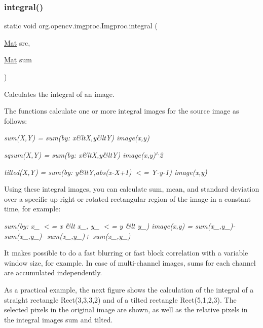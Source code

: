 \subsubsection{\texorpdfstring{integral()}{integral()}\hspace{0.1cm}{\footnotesize\ttfamily [2/2]}}
{\footnotesize\ttfamily static void org.\+opencv.\+imgproc.\+Imgproc.\+integral (\begin{DoxyParamCaption}\item[{\mbox{\hyperlink{classorg_1_1opencv_1_1core_1_1_mat}{Mat}}}]{src,  }\item[{\mbox{\hyperlink{classorg_1_1opencv_1_1core_1_1_mat}{Mat}}}]{sum }\end{DoxyParamCaption})\hspace{0.3cm}{\ttfamily [static]}}

Calculates the integral of an image.

The functions calculate one or more integral images for the source image as follows\+:

{\itshape sum(\+X,\+Y) = sum(by\+: x\&lt\+X,y\&lt\+Y) image(x,y)}

{\itshape sqsum(\+X,\+Y) = sum(by\+: x\&lt\+X,y\&lt\+Y) image(x,y)$^\wedge$2}

{\itshape tilted(\+X,\+Y) = sum(by\+: y\&ltY,abs(x-\/\+X+1) $<$= Y-\/y-\/1) image(x,y)}

Using these integral images, you can calculate sum, mean, and standard deviation over a specific up-\/right or rotated rectangular region of the image in a constant time, for example\+:

{\itshape sum(by\+: x\+\_ $<$= x \&lt x\+\_, y\+\_ $<$= y \&lt y\+\_) image(x,y) = sum(x\+\_,y\+\_)-\/ sum(x\+\_,y\+\_)-\/ sum(x\+\_,y\+\_)+ sum(x\+\_,y\+\_)}

It makes possible to do a fast blurring or fast block correlation with a variable window size, for example. In case of multi-\/channel images, sums for each channel are accumulated independently.

As a practical example, the next figure shows the calculation of the integral of a straight rectangle {\ttfamily Rect(3,3,3,2)} and of a tilted rectangle {\ttfamily Rect(5,1,2,3)}. The selected pixels in the original {\ttfamily image} are shown, as well as the relative pixels in the integral images {\ttfamily sum} and {\ttfamily tilted}.


